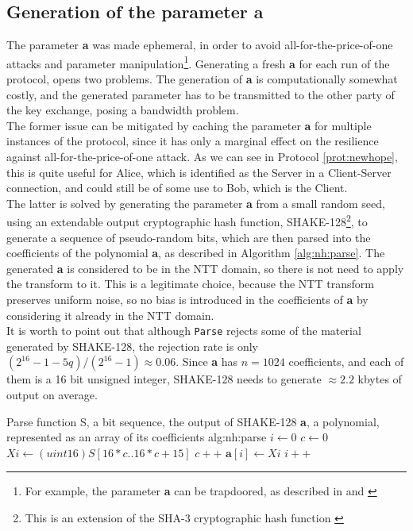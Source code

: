 \subsection{Generation of the parameter \textbf{a}}\label{sec:nh:a_generation}
The parameter \textbf{a} was made ephemeral, in order to avoid all-for-the-price-of-one attacks and parameter manipulation\footnote{For example, the parameter \textbf{a} can be trapdoored, as described in \cite{RLWE_trapdoor} and \cite{newhope}}. Generating a fresh \textbf{a} for each run of the protocol, opens two problems. The generation of \textbf{a} is computationally somewhat costly, and the generated parameter has to be transmitted to the other party of the key exchange, posing a bandwidth problem.\\
The former issue can be mitigated by caching the parameter \textbf{a} for multiple instances of the protocol, since it has only a marginal effect on the resilience against all-for-the-price-of-one attack. As we can see in Protocol \ref{prot:newhope}, this is quite useful for Alice, which is identified as the Server in a Client-Server connection, and could still be of some use to Bob, which is the Client.\\
The latter is solved by generating the parameter \textbf{a} from a small random seed, using an extendable output cryptographic hash function, SHAKE-128\footnote{This is an extension of the SHA-3 cryptographic hash function \cite{SHA3_FIPS}}, to generate a sequence of pseudo-random bits, which are then parsed into the coefficients of the polynomial \textbf{a}, as described in Algorithm \ref{alg:nh:parse}. The generated \textbf{a} is considered to be in the NTT domain, so there is not need to apply the transform to it. This is a legitimate choice, because the NTT transform preserves uniform noise, so no bias is introduced in the coefficients of \textbf{a} by considering it already in the NTT domain.\\
It is worth to point out that although \verb|Parse| rejects some of the material generated by SHAKE-128, the rejection rate is only $(2^{16}-1-5q)/(2^{16}-1) \approx 0.06$. Since \textbf{a} has $n=1024$ coefficients, and each of them is a 16 bit unsigned integer, SHAKE-128 needs to generate $\approx 2.2$ kbytes of output on average.
\begin{b_algorithm}{Parse function}
{S, a bit sequence, the output of SHAKE-128}
{\textbf{a}, a polynomial, represented as an array of its coefficients}
{alg:nh:parse}
\STATE $i \gets 0$
\STATE $c \gets 0$
    \STATE $Xi \gets (uint16)S[16*c .. 16*c+15]$
    \STATE $c++$
        \STATE $\textbf{a}[i] \gets Xi$
        \STATE $i++$
    \ENDIF
\ENDWHILE
\end{b_algorithm}

